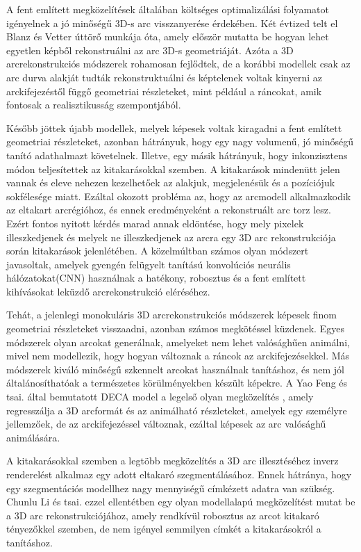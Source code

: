 \documentclass[12pt,a4]{article}
\begin{document}
        A fent említett megközelítések általában költséges optimalizálási folyamatot igényelnek a jó minőségű 3D-s arc visszanyerése érdekében. Két évtized telt el \cite{blanzvetter}Blanz és Vetter úttörő munkája óta, amely először mutatta be hogyan lehet egyetlen képből rekonstruálni az arc 3D-s geometriáját. Azóta a 3D arcrekonstrukciós módszerek rohamosan fejlődtek, de a korábbi modellek csak az arc durva alakját tudták rekonstruktuálni és képtelenek voltak kinyerni az arckifejezéstől függő geometriai részleteket, mint például a ráncokat, amik fontosak a realisztikusság szempontjából.

        Később jöttek újabb modellek, melyek képesek voltak kiragadni a fent említett geometriai részleteket, azonban hátrányuk, hogy egy nagy volumenű, jó minőségű tanító adathalmazt követelnek. Illetve, egy másik hátrányuk, hogy inkonzisztens módon teljesítettek az kitakarásokkal szemben. A kitakarások mindenütt jelen vannak és eleve nehezen kezelhetőek az alakjuk, megjelenésük és a pozíciójuk sokfélesége miatt. Ezáltal okozott probléma az, hogy az arcmodell alkalmazkodik az eltakart arcrégióhoz, és ennek eredményeként a rekonstruált arc torz lesz. Ezért fontos nyitott kérdés marad annak eldöntése, hogy mely pixelek illeszkedjenek és melyek ne illeszkedjenek az arcra egy 3D arc rekonstrukciója során kitakarások jelenlétében. A közelmúltban számos olyan módszert javasoltak, amelyek gyengén felügyelt tanítású konvolúciós neurális hálózatokat(CNN) használnak a hatékony, robosztus és a fent említett kihívásokat leküzdő arcrekonstrukció eléréséhez.

        Tehát, a jelenlegi monokuláris 3D arcrekonstrukciós módszerek képesek finom geometriai részleteket visszaadni, azonban számos megkötéssel küzdenek. Egyes módszerek olyan arcokat generálnak, amelyeket nem lehet valósághűen animálni, mivel nem modellezik, hogy hogyan változnak a ráncok az arckifejezésekkel. Más módszerek kiváló minőségű szkennelt arcokat használnak tanításhoz, és nem jól általánosíthatóak a természetes körülményekben készült képekre. A Yao Feng és tsai. által bemutatott DECA model a legelső olyan megközelítés \cite{deca}, amely regresszálja a 3D arcformát és az animálható részleteket, amelyek egy személyre jellemzőek, de az arckifejezéssel változnak, ezáltal képesek az arc valósághű animálására.

        A kitakarásokkal szemben a legtöbb megközelítés a 3D arc illesztéséhez inverz renderelést alkalmaz egy adott eltakaró szegmentálásához. Ennek hátránya, hogy egy szegmentációs modellhez nagy mennyiségű címkézett adatra van szükség. Chunlu Li és tsai. \cite{focus} ezzel ellentétben egy olyan modellalapú megközelítést mutat be a 3D arc rekonstrukciójához, amely rendkívül robosztus az arcot kitakaró tényezőkkel szemben, de nem igényel semmilyen címkét a kitakarásokról a tanításhoz.
\end{document}
